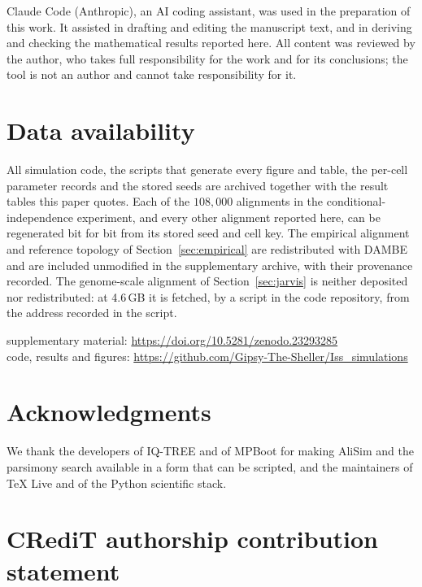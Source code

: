 \documentclass[11pt]{article}
\theoremstyle{definition}
\theoremstyle{remark}
\begin{document}
Claude Code (Anthropic), an AI coding assistant, was used in the preparation
of this work. It assisted in drafting and editing the manuscript text, and in
deriving and checking the mathematical results reported here. All content was
reviewed by the author, who takes full responsibility for the work and for its
conclusions; the tool is not an author and cannot take responsibility for it.

\section*{Data availability}
All simulation code, the scripts that generate every figure and table, the
per-cell parameter records and the stored seeds are archived together with
the result tables this paper quotes. Each of the $108{,}000$ alignments in
the conditional-independence experiment, and every other alignment reported
here, can be regenerated bit for bit from its stored seed and cell key. The
empirical alignment and reference topology of Section~\ref{sec:empirical}
are redistributed with DAMBE and are included unmodified in the
supplementary archive, with their provenance recorded. The genome-scale
alignment of Section~\ref{sec:jarvis} is neither deposited nor redistributed:
at 4.6\,GB it is fetched, by a script in the code repository, from the
address recorded in the script.

\begin{center}
supplementary material: \url{https://doi.org/10.5281/zenodo.23293285}\\
code, results and figures: \url{https://github.com/Gipsy-The-Sheller/Iss_simulations}
\end{center}

\section*{Acknowledgments}
We thank the developers of IQ-TREE and of MPBoot for making AliSim and the
parsimony search available in a form that can be scripted, and the maintainers
of TeX Live and of the Python scientific stack.

\section*{CRediT authorship contribution statement}
\end{document}
